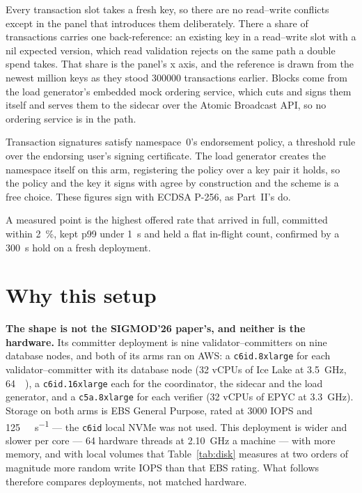 \documentclass[10pt,twocolumn]{article}
\begin{document}
Every transaction slot takes a fresh key, so there are no read--write conflicts except in the panel
that introduces them deliberately. There a share of transactions carries one back-reference: an
existing key in a read--write slot with a nil expected version, which read validation rejects on the
same path a double spend takes. That share is the panel's x axis, and the reference is drawn from the
newest million keys as they stood \num{300000} transactions earlier. Blocks come from the load generator's embedded mock ordering
service, which cuts and signs them itself and serves them to the sidecar over the Atomic Broadcast
API, so no ordering service is in the path.

Transaction signatures satisfy namespace~0's endorsement policy, a threshold rule over the endorsing
user's signing certificate. The load generator creates the namespace itself on this arm, registering
the policy over a key pair it holds, so the policy and the key it signs with agree by construction and
the scheme is a free choice. These figures sign with ECDSA P-256, as Part~II's do.

A measured point is the highest offered rate that arrived in full, committed within \SI{2}{\percent},
kept p99 under \SI{1}{\second} and held a flat in-flight count, confirmed by a \SI{300}{\second} hold
on a fresh deployment.

\section{Why this setup}

\textbf{The shape is not the SIGMOD'26 paper's, and neither is the hardware.} Its committer deployment
is nine validator--committers on nine database nodes, and both of its arms ran on AWS: a
\texttt{c6id.8xlarge} for each validator--committer with its database node (32 vCPUs of Ice Lake at
\SI{3.5}{\giga\hertz}, \SI{64}{\gibi\byte}), a \texttt{c6id.16xlarge} each for the coordinator, the
sidecar and the load generator, and a \texttt{c5a.8xlarge} for each verifier (32 vCPUs of EPYC at
\SI{3.3}{\giga\hertz}). Storage on both arms is EBS General Purpose, rated at \num{3000} IOPS and
\SI{125}{\mebi\byte\per\second} --- the \texttt{c6id} local NVMe was not used. This deployment is wider and slower per core --- 64 hardware
threads at \SI{2.10}{\giga\hertz} a machine --- with more memory, and with local volumes that
Table~\ref{tab:disk} measures at two orders of magnitude more random write IOPS than that EBS rating.
What follows therefore compares deployments, not matched hardware.
\end{document}
